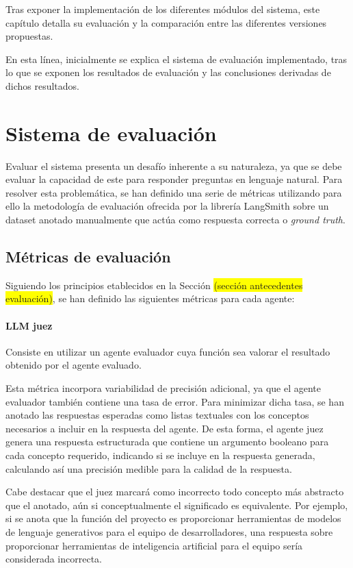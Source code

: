 Tras exponer la implementación de los diferentes módulos del sistema, este capítulo detalla su evaluación y la comparación entre las diferentes versiones propuestas.

En esta línea, inicialmente se explica el sistema de evaluación implementado, tras lo que se exponen los resultados de evaluación y las conclusiones derivadas de dichos resultados. 

\section{Sistema de evaluación}
Evaluar el sistema presenta un desafío inherente a su naturaleza, ya que se debe evaluar la capacidad de este para responder preguntas en lenguaje natural. Para resolver esta problemática, se han definido una serie de métricas utilizando para ello la metodología de evaluación ofrecida por la librería LangSmith sobre un dataset anotado manualmente que actúa como respuesta correcta o \textit{ground truth}.

\subsection{Métricas de evaluación}
Siguiendo los principios etablecidos en la Sección \colorbox{yellow}{(sección antecedentes evaluación)}, se han definido las siguientes métricas para cada agente:

\paragraph{LLM juez}Consiste en utilizar un agente evaluador cuya función sea valorar el resultado obtenido por el agente evaluado.

Esta métrica incorpora variabilidad de precisión adicional, ya que el agente evaluador también contiene una tasa de error. Para minimizar dicha tasa, se han anotado las respuestas esperadas como listas textuales con los conceptos necesarios a incluir en la respuesta del agente. De esta forma, el agente juez genera una respuesta estructurada que contiene un argumento booleano para cada concepto requerido, indicando si se incluye en la respuesta generada, calculando así una precisión medible para la calidad de la respuesta.

Cabe destacar que el juez marcará como incorrecto todo concepto más abstracto que el anotado, aún si conceptualmente el significado es equivalente. Por ejemplo, si se anota que la función del proyecto es proporcionar herramientas de modelos de lenguaje generativos para el equipo de desarrolladores, una respuesta sobre proporcionar herramientas de inteligencia artificial para el equipo sería considerada incorrecta.

